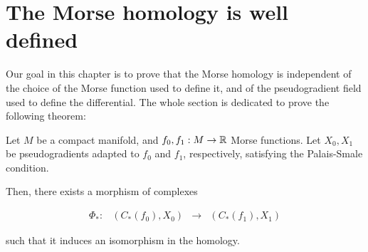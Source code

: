 \section{The Morse homology is well defined} \label{section:morse_well_defined}

Our goal in this chapter is to prove that the Morse homology is independent of the choice of the Morse function used to define it, and of the pseudogradient field used to define the differential. The whole section is dedicated to prove the following theorem:

\begin{theo}
Let $M$ be a compact manifold, and $f_0, f_1 : M \rightarrow \mathbb{R}$ Morse functions. Let $X_0, X_1$ be pseudogradients adapted to $f_0$ and $f_1$, respectively, satisfying the Palais-Smale condition.

Then, there exists a morphism of complexes

\begin{equation} \label{morphism}
\begin{array}{rccc} \Phi_{\ast} : & (C_{\ast}(f_0), X_0) & \longrightarrow & (C_{\ast}(f_1), X_1) \end{array}
\end{equation}

such that it induces an isomorphism in the homology.
\end{theo}

